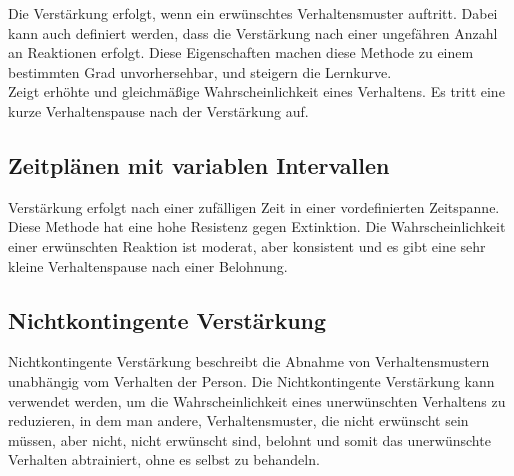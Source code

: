 		Die Verstärkung erfolgt, wenn ein erwünschtes Verhaltensmuster auftritt. Dabei kann auch definiert werden, dass die Verstärkung nach einer ungefähren Anzahl an Reaktionen erfolgt. Diese Eigenschaften machen diese Methode zu einem bestimmten Grad unvorhersehbar, und steigern die Lernkurve. \\
Zeigt erhöhte und gleichmäßige Wahrscheinlichkeit eines Verhaltens. Es tritt eine kurze Verhaltenspause nach der Verstärkung auf. \\

		\subsection{Zeitplänen mit variablen Intervallen}
		
		Verstärkung erfolgt nach einer zufälligen Zeit in einer vordefinierten Zeitspanne. \\
Diese Methode hat eine hohe Resistenz gegen Extinktion. Die Wahrscheinlichkeit einer erwünschten Reaktion ist moderat, aber konsistent und es gibt eine sehr kleine Verhaltenspause nach einer Belohnung. \\

		
		\subsection{Nichtkontingente Verstärkung}
		
		Nichtkontingente Verstärkung beschreibt die Abnahme von Verhaltensmustern unabhängig vom Verhalten der Person. Die Nichtkontingente Verstärkung kann verwendet werden, um die Wahrscheinlichkeit eines unerwünschten Verhaltens zu reduzieren, in dem man andere, Verhaltensmuster, die nicht erwünscht sein müssen, aber nicht, nicht erwünscht sind, belohnt und somit das unerwünschte Verhalten abtrainiert, ohne es selbst zu behandeln. \\
